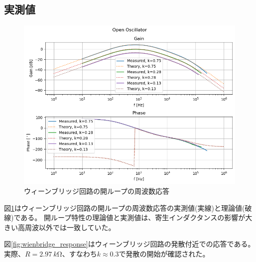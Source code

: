 \documentclass[a4paper]{ltjsarticle}
\begin{document}
\subsection{実測値}
\begin{figure}[htbp]
    \centering
    \includegraphics[width=0.8\columnwidth]{./images/wienbridge_bode.png}
    \caption{ウィーンブリッジ回路の開ループの周波数応答}
    \label{fig:wienbridge_bode}
\end{figure}
図\ref{fig:wienbridge_bode}はウィーンブリッジ回路の開ループの周波数応答の実測値(実線)と理論値(破線)である。
開ループ特性の理論値と実測値は、寄生インダクタンスの影響が大きい高周波以外では一致していた。

図\ref{fig:wienbridge_response}はウィーンブリッジ回路の発散付近での応答である。
実際、$R=\SI{2.97}{k\ohm}$、すなわち$k\approx0.3$で発散の開始が確認された。
\end{document}

